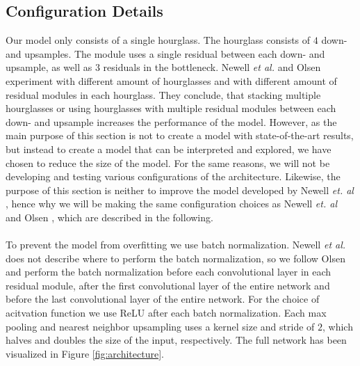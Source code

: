 \documentclass[./main.tex]{subfiles}
\begin{document}
\subsection{Configuration Details}\label{subsec:conf_details}
Our model only consists of a single hourglass. The hourglass consists of $4$ down- and upsamples. The module uses a single residual between each down- and upsample, as well as $3$ residuals in the bottleneck. Newell \textit{et al.} \cite{Newell} and Olsen \cite{Camilla} experiment with different amount of hourglasses and with different amount of residual modules in each hourglass. They conclude, that stacking multiple hourglasses or using hourglasses with multiple residual modules between each down- and upsample increases the performance of the model. However, as the main purpose of this section is not to create a model with state-of-the-art results, but instead to create a model that can be interpreted and explored, we have chosen to reduce the size of the model. For the same reasons, we will not be developing and testing various configurations of the architecture. Likewise, the purpose of this section is neither to improve the model developed by Newell \textit{et. al} \cite{Newell}, hence why we will be making the same configuration choices as Newell \textit{et. al} \cite{Newell} and Olsen \cite{Camilla}, which are described in the following.
\\
\\
To prevent the model from overfitting we use batch normalization. Newell \textit{et al.} does not describe where to perform the batch normalization, so we follow Olsen \cite{Camilla} and perform the batch normalization before each convolutional layer in each residual module, after the first convolutional layer of the entire network and before the last convolutional layer of the entire network. For the choice of acitvation function we use ReLU after each batch normalization. Each max pooling and nearest neighbor upsampling uses a kernel size and stride of $2$, which halves and doubles the size of the input, respectively. The full network has been visualized in Figure \ref{fig:architecture}.
\\
\end{document}
